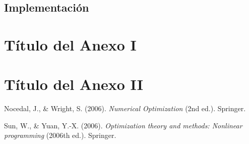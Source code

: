 \documentclass[11pt,a4paper]{book}
\theoremstyle{definition}
\theoremstyle{remark}
\begin{document}
\section{Implementación}





\appendix
\renewcommand{\thechapter}{\Roman{chapter}}
\chapter{Título del Anexo I}


\chapter{Título del Anexo II}

\backmatter

\begin{thebibliography}{99}

%


 Nocedal, J., \& Wright, S. (2006). \emph{Numerical Optimization} (2nd ed.). Springer.

 Sun, W., \& Yuan, Y.-X. (2006). \emph{Optimization theory and methods: Nonlinear programming} (2006th ed.). Springer.

%
\end{thebibliography}
\end{document}
